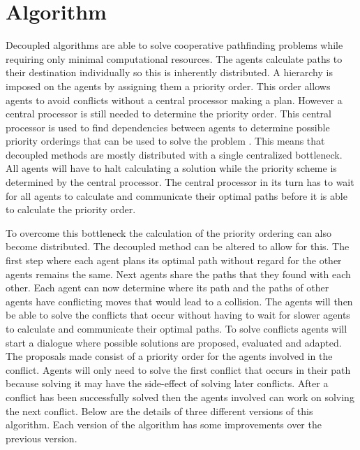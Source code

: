 \section{Algorithm}\label{sec:method}
Decoupled algorithms are able to solve cooperative pathfinding problems while
requiring only minimal computational resources. The agents calculate paths to
their destination individually so this is inherently distributed. A hierarchy
is imposed on the agents by assigning them a priority order. This order allows
agents to avoid conflicts without a central processor making a plan. However a
central processor is still needed to determine the priority order. This central
processor is used to
find dependencies between agents to determine possible priority orderings that
can be used to solve the problem \cite{latombe1991,bennewitz2002}. This means
that decoupled methods are mostly distributed with a single centralized
bottleneck. All agents will have to halt calculating a solution while the
priority scheme is determined by the central processor. The central processor
in its turn has to wait for all agents to calculate and communicate their
optimal paths before it is able to calculate the priority order.

To overcome this bottleneck the calculation of the priority ordering can also
become distributed. The decoupled method can be
altered to allow for this. The first step where each agent plans its optimal
path without regard for the other agents remains the same. Next agents share
the paths that they found with each other. Each agent can now determine where
its path and the paths of other agents have conflicting moves that would lead 
to a collision. The agents will then be able to solve the conflicts that occur 
without having to wait for slower agents to
calculate and communicate their optimal paths. To solve conflicts agents will
start a dialogue where possible solutions are proposed, evaluated and adapted.
The proposals made consist of a priority order for the agents involved in the
conflict. Agents will only need to solve the first conflict that occurs in
their path because solving it may have the side-effect of solving later
conflicts. After a conflict has been successfully solved then the agents
involved can work on solving the next conflict.
Below are the details of three different versions of this algorithm. Each
version of the algorithm has some improvements over the previous version.

